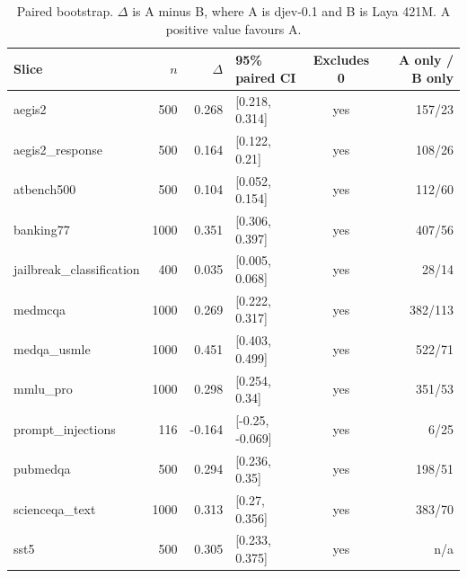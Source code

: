 \begin{table}[t]
\centering
\caption{Paired bootstrap. $\Delta$ is A minus B, where A is djev-0.1 and B is Laya 421M. A positive value favours A.}
\small
\begin{tabular}{lrrlcr}
\toprule
Slice & $n$ & $\Delta$ & 95\% paired CI & Excludes 0 & A only / B only \\
\midrule
  aegis2 & 500 & 0.268 & [0.218, 0.314] & yes & 157/23 \\
  aegis2\_response & 500 & 0.164 & [0.122, 0.21] & yes & 108/26 \\
  atbench500 & 500 & 0.104 & [0.052, 0.154] & yes & 112/60 \\
  banking77 & 1000 & 0.351 & [0.306, 0.397] & yes & 407/56 \\
  jailbreak\_classification & 400 & 0.035 & [0.005, 0.068] & yes & 28/14 \\
  medmcqa & 1000 & 0.269 & [0.222, 0.317] & yes & 382/113 \\
  medqa\_usmle & 1000 & 0.451 & [0.403, 0.499] & yes & 522/71 \\
  mmlu\_pro & 1000 & 0.298 & [0.254, 0.34] & yes & 351/53 \\
  prompt\_injections & 116 & -0.164 & [-0.25, -0.069] & yes & 6/25 \\
  pubmedqa & 500 & 0.294 & [0.236, 0.35] & yes & 198/51 \\
  scienceqa\_text & 1000 & 0.313 & [0.27, 0.356] & yes & 383/70 \\
  sst5 & 500 & 0.305 & [0.233, 0.375] & yes & n/a \\
\bottomrule
\end{tabular}
\end{table}

